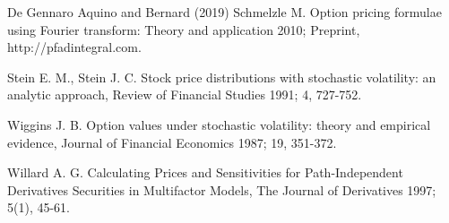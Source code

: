 \documentclass{article}
\begin{document}
\begin{thebibliography}{De Gennaro Aquino and Bernard (2019)}
 Schmelzle M. Option pricing
formulae using Fourier transform: Theory and application 2010; Preprint,
http://pfadintegral.com.

 Stein E. M., Stein J. C. Stock
price distributions with stochastic volatility: an analytic approach, Review
of Financial Studies 1991; 4, 727-752.

 Wiggins J. B. Option values under
stochastic volatility: theory and empirical evidence, Journal of Financial
Economics 1987; 19, 351-372.

 Willard A. G. Calculating Prices and
Sensitivities for Path-Independent Derivatives Securities in Multifactor
Models, The Journal of Derivatives 1997; 5(1), 45-61.
\end{thebibliography}
\end{document}

